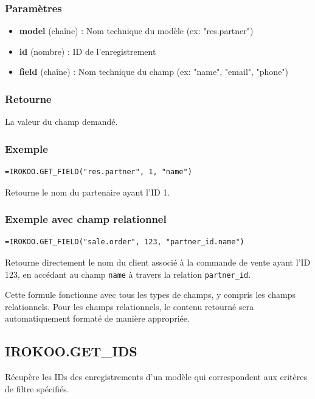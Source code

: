 \documentclass[12pt, a4paper]{article}
\begin{document}
\subsubsection{Paramètres}
\begin{itemize}
    \item \textbf{model} (chaîne) : Nom technique du modèle (ex: "res.partner")
    \item \textbf{id} (nombre) : ID de l'enregistrement
    \item \textbf{field} (chaîne) : Nom technique du champ (ex: "name", "email", "phone")
\end{itemize}

\subsubsection{Retourne}
La valeur du champ demandé.

\subsubsection{Exemple}
\begin{lstlisting}
=IROKOO.GET_FIELD("res.partner", 1, "name")
\end{lstlisting}
Retourne le nom du partenaire ayant l'ID 1.

\subsubsection{Exemple avec champ relationnel}
\begin{lstlisting}
=IROKOO.GET_FIELD("sale.order", 123, "partner_id.name")
\end{lstlisting}
Retourne directement le nom du client associé à la commande de vente ayant l'ID 123, en accédant au champ \texttt{name} à travers la relation \texttt{partner\_id}.

\begin{tip}
Cette formule fonctionne avec tous les types de champs, y compris les champs relationnels. Pour les champs relationnels, le contenu retourné sera automatiquement formaté de manière appropriée.
\end{tip}

\subsection{IROKOO.GET\_IDS}
\begin{tcolorbox}[title=Description]
Récupère les IDs des enregistrements d'un modèle qui correspondent aux critères de filtre spécifiés.
\end{tcolorbox}
\end{document}
